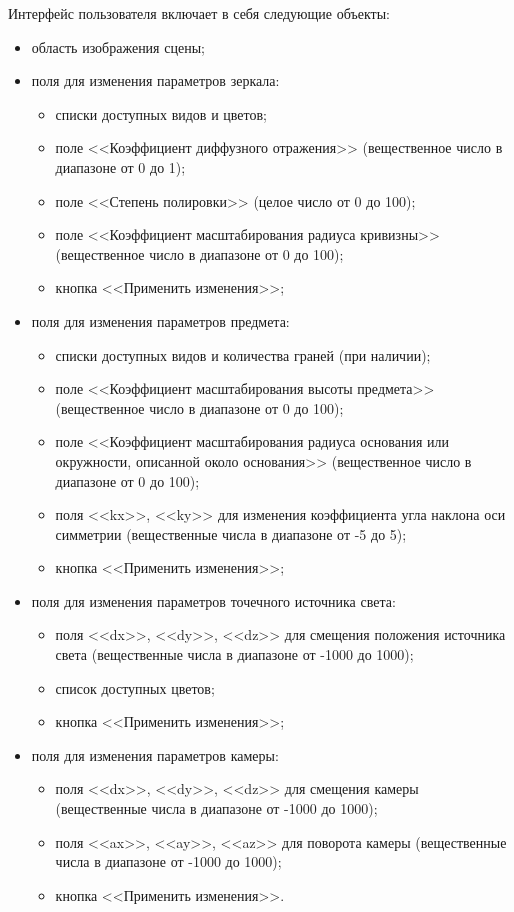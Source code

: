 Интерфейс пользователя включает в себя следующие объекты:

\begin{itemize}
	\item область изображения сцены;
	\item {поля для изменения параметров зеркала:
	\begin{itemize}
		\item списки доступных видов и цветов;
		\item поле <<Коэффициент диффузного отражения>> (вещественное число в диапазоне от 0 до 1);
		\item поле <<Степень полировки>> (целое число от 0 до 100);
		\item поле <<Коэффициент масштабирования радиуса кривизны>> (вещественное число в диапазоне от 0 до 100);
		\item кнопка <<Применить изменения>>;
	\end{itemize}
}
	\item {поля для изменения параметров предмета:
	\begin{itemize}
		\item списки доступных видов и количества граней (при наличии);
		\item поле <<Коэффициент масштабирования высоты предмета>> (вещественное число в диапазоне от 0 до 100);
		\item поле <<Коэффициент масштабирования радиуса основания или окружности, описанной около основания>> (вещественное число в диапазоне от 0 до 100);
		\item поля <<kx>>, <<ky>> для изменения коэффициента угла наклона оси симметрии (вещественные числа в диапазоне от -5 до 5);
		\item кнопка <<Применить изменения>>;
	\end{itemize}
}
	\item {поля для изменения параметров точечного источника света:
	\begin{itemize}
		\item поля <<dx>>, <<dy>>, <<dz>> для смещения положения источника света (вещественные числа в диапазоне от -1000 до 1000);
		\item список доступных цветов;
		\item кнопка <<Применить изменения>>;
	\end{itemize}
}
	\item {поля для изменения параметров камеры:
		\begin{itemize}
			\item поля <<dx>>, <<dy>>, <<dz>> для смещения камеры (вещественные числа в диапазоне от -1000 до 1000);
			\item поля <<ax>>, <<ay>>, <<az>> для поворота камеры (вещественные числа в диапазоне от -1000 до 1000);
			\item кнопка <<Применить изменения>>.
		\end{itemize}
	}
\end{itemize}

